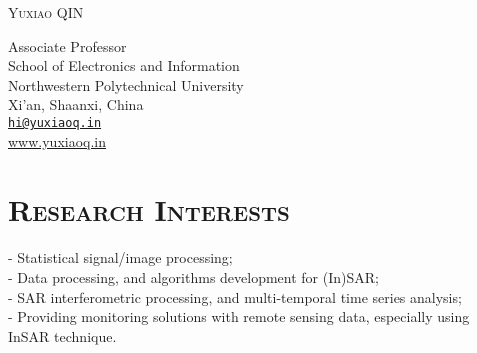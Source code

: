 \documentclass[letterpaper]{article}
\def\name{\textsc{Yuxiao QIN}}
\begin{document}
{\huge \name}


\vspace{0.2in}

\begin{minipage}{0.8\linewidth}
  Associate Professor \\
  School of Electronics and Information\\
  Northwestern Polytechnical University \\
  Xi'an, Shaanxi, China\\ 
  \href{mailto:hi@yuxiaoq.in}{\tt hi@yuxiaoq.in} \\ 
  \href{www.yuxiaoq.in}{www.yuxiaoq.in}
\end{minipage}


\section*{\textsc{Research Interests}}
- Statistical signal/image processing;\\
- Data processing, and algorithms development for (In)SAR;\\
- SAR interferometric processing, and multi-temporal time series analysis;\\
- Providing monitoring solutions with remote sensing data, especially using InSAR technique. 


\end{document}
